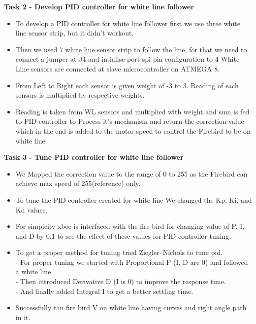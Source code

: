 \documentclass[report]{res}
\begin{document}
		
	{\Large \textbf{Task 2 - Develop PID controller for white line follower}\par}
	\begin{itemize}
		
		\item To develop a PID controller for white line follower first we use three white line sensor strip, but it didn't workout. \\
		\item Then we used 7 white line sensor strip to follow the line, for that we need to connect a jumper at J4 and intialise port spi pin configuration to 4 White Line sensors are connected at slave microcontroller on ATMEGA 8. \\
		\item From Left to Right each sensor is given weight of -3 to 3. Reading of each sensors is multiplied by respective weights. \\
		\item Reading is taken from WL sensors and multiplied with weight and sum is fed to PID controller to Process it's mechanism and return the correction value which in the end is added to the motor speed to control the Firebird to be on white line.\\
	
	\end{itemize}
	
	
	{\Large \textbf{Task 3 - Tune PID controller for white line follower}\par}
	\begin{itemize}
		
		\item We Mapped the correction value to the range of 0 to 255 as the Firebird can achieve max speed of 255(reference) only. \\
		\item To tune the PID controller created for white line We changed the Kp, Ki, and Kd values. \\
		\item For simpicity xbee is interfaced with the fire bird for changing value of P, I, and D by 0.1 to see the effect of these values for PID controllor tuning. \\
		\item To get a proper method for tuning tried Ziegler–Nichols to tune pid.\\
			- For proper tuning we started with Proportional P (I, D are 0) and followed 
			  a white line.\\
			- Then introduced Derivative D (I is 0) to improve the response time.\\
		    - And finally added Integral I to get a better settling time.\\
	    \item Successfully ran fire bird V on white line having curves and right angle path in it.\\ \\
    
   	\end{itemize}
   	
\end{document}
